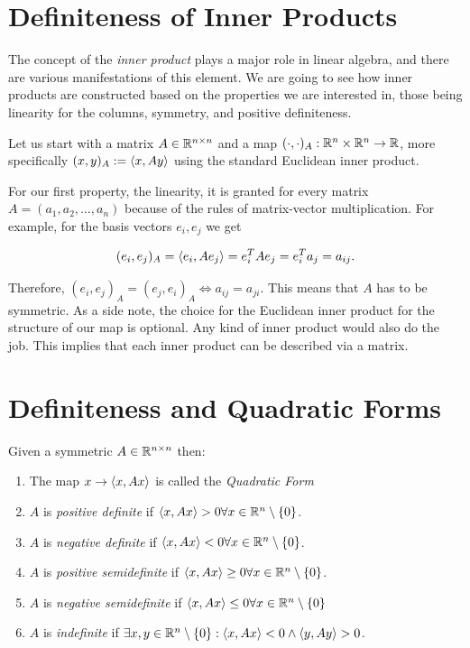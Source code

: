 \QED

\section{Definiteness of Inner Products}

The concept of the \emph{inner product} plays a major role in linear algebra, and there are various 
manifestations of this element. We are going to see how inner products are constructed based on the 
properties we are interested in, those being linearity for the columns, symmetry, and positive definiteness.

Let us start with a matrix \(A \in \mathbb{R}^{n \times n}\) and a map \((\cdot , \cdot)_A : \mathbb{R}^n \times \mathbb{R}^n \to \mathbb{R} \), more specifically 
\((x,y)_A := \left\langle x, Ay\right\rangle\) using the standard Euclidean inner product.

For our first property, the linearity, it is granted for every matrix \(A = (a_1, a_2, \dots, a_n)\) 
because of the rules of matrix-vector multiplication. For example, for the basis vectors \(e_i, e_j\) 
we get 

\[
    (e_i, e_j)_A = \left\langle e_i, Ae_j\right\rangle = e_{i}^{T} A e_j = e_{i}^{T} a_j = a_{ij}.
\]

Therefore, \((e_i, e_j)_A = (e_j, e_i)_A \iff a_{ij} = a_{ji}\). This means that \(A\) has to be symmetric.
As a side note, the choice for the Euclidean inner product for the structure of our map is optional. Any
kind of inner product would also do the job. This implies that each inner product can be described via a 
matrix.

\section{Definiteness and Quadratic Forms}

Given a symmetric \(A \in \mathbb{R}^{n \times n}\) then:

\begin{enumerate}
    
    \item The map \(x \to \left\langle x, Ax\right\rangle\) is called the \emph{Quadratic Form}
    
    \item \(A\) is \emph{positive definite} if \(\left\langle x, Ax\right\rangle > 0 \forall x \in \mathbb{R}^n 
          \setminus \{0\}\).

    \item \(A\) is \emph{negative definite} if \(\left\langle x, Ax\right\rangle < 0 \forall x \in \mathbb{R}^n 
          \setminus \{0\}\).
    
    \item \(A\) is \emph{positive semidefinite} if \(\left\langle x, Ax\right\rangle \ge 0 \forall x \in \mathbb{R}^n 
          \setminus \{0\}\).

    \item \(A\) is \emph{negative semidefinite} if \(\left\langle x, Ax\right\rangle \le 0 \forall x \in \mathbb{R}^n 
          \setminus \{0\}\)

    \item \(A\) is \emph{indefinite} if \(\exists x,y \in \mathbb{R}^n  \setminus \{0\}: \left\langle x, Ax\right\rangle 
          < 0 \land \left\langle y, Ay\right\rangle > 0 \).
    
\end{enumerate}

